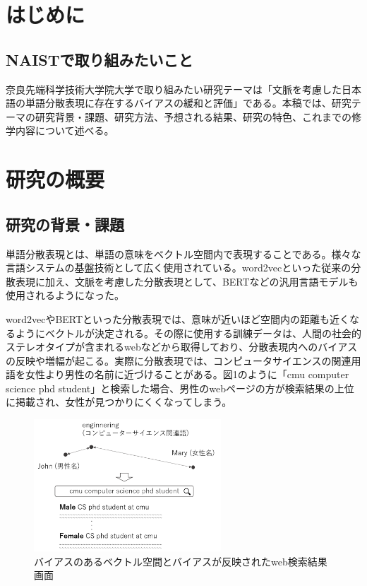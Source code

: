\documentclass[a4j,10pt, twocolumn]{jarticle} \usepackage[dvipdfmx]{graphicx} \usepackage{amssymb} \usepackage{amsmath}
\begin{document}


\section{はじめに}
\subsection{NAISTで取り組みたいこと}
奈良先端科学技術大学院大学で取り組みたい研究テーマは「文脈を考慮した日本語の単語分散表現に存在するバイアスの緩和と評価」である。本稿では、研究テーマの研究背景・課題、研究方法、予想される結果、研究の特色、これまでの修学内容について述べる。

\section{研究の概要}
\subsection{研究の背景・課題}
単語分散表現とは、単語の意味をベクトル空間内で表現することである。様々な言語システムの基盤技術として広く使用されている。word2vecといった従来の分散表現に加え、文脈を考慮した分散表現として、BERTなどの汎用言語モデルも使用されるようになった。

word2vecやBERTといった分散表現では、意味が近いほど空間内の距離も近くなるようにベクトルが決定される。その際に使用する訓練データは、人間の社会的ステレオタイプが含まれるwebなどから取得しており、分散表現内へのバイアスの反映や増幅が起こる。実際に分散表現では、コンピュータサイエンスの関連用語を女性より男性の名前に近づけることがある。図1のように「cmu computer science phd student」と検索した場合、男性のwebページの方が検索結果の上位に掲載され、女性が見つかりにくくなってしまう\cite{Bolukbasi}。
\begin{figure}[ht]
    \centering
    \includegraphics[width=70mm]{./bias_in_web.png}
    \caption{バイアスのあるベクトル空間とバイアスが反映されたweb検索結果画面}
\end{figure}
\end{document}
